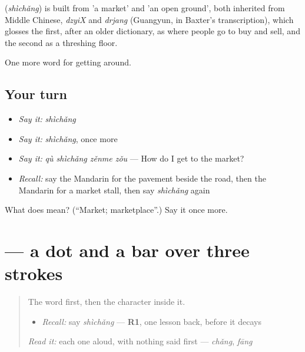 \begin{cousinweb}
\textbf{} (\emph{shìchǎng}) is built from  'a market' and  'an open ground', both inherited from Middle Chinese, \emph{dzyiX} and \emph{drjang} (Guangyun, in Baxter's transcription), which glosses the first, after an older dictionary, as where people go to buy and sell, and the second as a threshing floor.
\end{cousinweb}

\begin{grammarlens}[title={What you've built}]
One more word for getting around.
\end{grammarlens}

\subsection*{Your turn}
\begin{itemize}
\raggedright
  \item \emph{Say it:} \emph{shìchǎng}
  \item \emph{Say it:} \emph{shìchǎng}, once more
  \item \emph{Say it:} \emph{qù shìchǎng zěnme zǒu} — How do I get to the market?
  \item \emph{Recall:} say the Mandarin for the pavement beside the road, then the Mandarin for a market stall, then say \emph{shìchǎng} again
\end{itemize}

\begin{tcolorbox}[breakable,colback=teal!4,colframe=teal!35!black,title={Before you move on}]
What does  mean? (\textquotedblleft{}Market; marketplace\textquotedblright{}.) Say it once more.
\end{tcolorbox}
\section[\texorpdfstring{\zh{市} (shì)}{市 (shì)}]{ — a dot and a bar over three strokes}

\label{lesson:ZH-W448-shi-market}



\begin{quote}
The word first, then the character inside it.

\begin{itemize}
\raggedright
  \item \emph{Recall:} say \emph{shìchǎng} — \textbf{R1}, one lesson back, before it decays
\end{itemize}

\begin{quote}
 
\end{quote}

\emph{Read it:} each one aloud, with nothing said first — \emph{chǎng}, \emph{fāng}
\end{quote}

